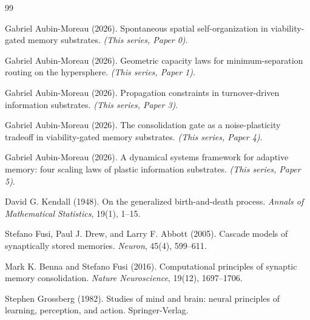 \documentclass[11pt]{article}
\begin{document}
\begin{thebibliography}{99}

Gabriel Aubin-Moreau (2026).
Spontaneous spatial self-organization in viability-gated memory substrates.
\textit{(This series, Paper 0)}.

Gabriel Aubin-Moreau (2026).
Geometric capacity laws for minimum-separation routing on the hypersphere.
\textit{(This series, Paper 1)}.

Gabriel Aubin-Moreau (2026).
Propagation constraints in turnover-driven information substrates.
\textit{(This series, Paper 3)}.

Gabriel Aubin-Moreau (2026).
The consolidation gate as a noise-plasticity tradeoff in viability-gated memory substrates.
\textit{(This series, Paper 4)}.

Gabriel Aubin-Moreau (2026).
A dynamical systems framework for adaptive memory: four scaling laws of plastic information substrates.
\textit{(This series, Paper 5)}.

David G. Kendall (1948).
On the generalized birth-and-death process.
\textit{Annals of Mathematical Statistics}, 19(1), 1--15.

Stefano Fusi, Paul J. Drew, and Larry F. Abbott (2005).
Cascade models of synaptically stored memories.
\textit{Neuron}, 45(4), 599--611.

Mark K. Benna and Stefano Fusi (2016).
Computational principles of synaptic memory consolidation.
\textit{Nature Neuroscience}, 19(12), 1697--1706.

Stephen Grossberg (1982).
Studies of mind and brain: neural principles of learning, perception, and action.
Springer-Verlag.

\end{thebibliography}
\end{document}
